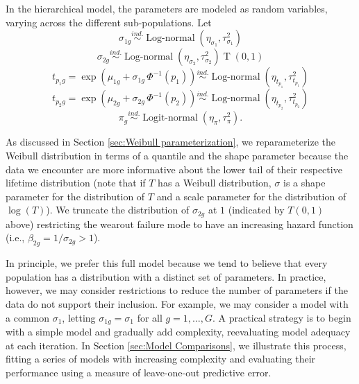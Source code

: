\documentclass[12pt]{article}
\newcommand{\ind}{\stackrel{ind.}{\sim}}
\newcommand{\op}{\operatorname}
\begin{document}
In the hierarchical model, the parameters are modeled as random variables, varying across the different sub-populations.  Let
\begin{equation*}
\sigma_{1g} \ind \op{Log-normal} \left( \eta_{\sigma_1}, \tau^2_{\sigma_1} \right)
\end{equation*}
\begin{equation*}
\sigma_{2g} \ind \op{Log-normal} \left( \eta_{\sigma_2}, \tau^2_{\sigma_2}\right)\op{T}\left(0, 1\right)
\end{equation*}
\begin{equation}
\label{eq:hier-model}
t_{p_{1}g} = \exp\left(\mu_{1g} + \sigma_{1g}\,\Phi^{-1}(p_1)\right)  \ind \op{Log-normal} \left(\eta_{t_{p_1}}, \tau^2_{t_{p_1}}\right)
\end{equation}
\begin{equation*}
t_{p_{2}g} = \exp\left(\mu_{2g} + \sigma_{2g}\,\Phi^{-1}(p_2)\right)  \ind \op{Log-normal} \left(\eta_{t_{p_2}}, \tau^2_{t_{p_2}}\right)
\end{equation*}
\begin{equation*}
\pi_g \ind \op{Logit-normal}(\eta_\pi, \tau^2_\pi).
\end{equation*}

As discussed in Section \ref{sec:Weibull parameterization}, we reparameterize the Weibull distribution in terms of a quantile and the shape parameter because the data we encounter are more informative about the lower tail of their respective lifetime distribution (note that if $T$ has a Weibull distribution, $\sigma$ is a shape parameter for the distribution of $T$ and a scale parameter for the distribution of $\log(T)$). We truncate the distribution of $\sigma_{2g}$ at $1$ (indicated by $T(0,1)$ above) restricting the wearout failure mode to have an increasing hazard function (i.e., $\beta_{2g} = 1/\sigma_{2g}>1$). %

In principle, we prefer this full model because we tend to believe that every population has a distribution with a distinct set of parameters. In practice, however, we may consider restrictions to reduce the number of parameters if the data do not support their inclusion. For example, we may consider a model with a common $\sigma_{1}$, letting $\sigma_{1g}=\sigma_1$ for all $g=1,\ldots,G$. A practical strategy is to begin with a simple model and gradually add complexity, reevaluating model adequacy at each iteration. In Section \ref{sec:Model Comparisons}, we illustrate this process, fitting a series of models with increasing complexity and evaluating their performance using a measure of leave-one-out predictive error.
\end{document}
